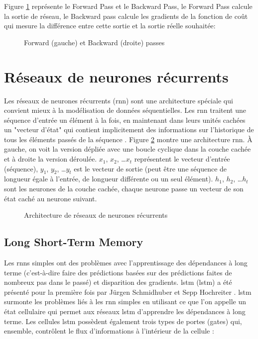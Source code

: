 Figure \ref{fig:forward-backward-pass} représente le Forward Pass et le Backward Pass, le Forward Pass calcule la sortie de réseau, le Backward pass calcule les gradients de la fonction de coût qui mesure la différence entre cette sortie et la sortie réelle souhaitée:

\begin{figure}[h]
    \centering
	
    \caption{Forward (gauche) et Backward (droite) passes}
    \label{fig:forward-backward-pass}
\end{figure}


\section{Réseaux de neurones récurrents}
Les réseaux de neurones récurrents (\acrshort{rnn}) sont une architecture spéciale qui convient mieux à la modélisation de données séquentielles. Les \acrshort{rnn} traitent une séquence d'entrée un élément à la fois, en maintenant dans leurs unités cachées un "vecteur d'état" qui contient implicitement des informations sur l'historique de tous les éléments passés de la séquence \cite{LeCun2015}. Figure \ref{fig:rnn} montre une architecture \acrshort{rnn}. À gauche, on voit la version dépliée avec une boucle cyclique dans la couche cachée et à droite la version déroulée. $x_1$, $x_2$, …$x_t$ représentent le vecteur d'entrée (séquence), $y_1$, $y_2$, …$y_t$ est le vecteur de sortie (peut être une séquence de longueur égale à l'entrée, de longueur différente ou un seul élément). $h_1$, $h_2$, …$h_t$ sont les neurones de la couche cachée, chaque neurone passe un vecteur de son état caché au neurone suivant.

\begin{figure}[H]
    \centering
    
    \caption{Architecture de réseaux de neurones récurrents}
    \label{fig:rnn}
\end{figure}

\subsection{Long Short-Term Memory}
\label{section:lstm}
Les \acrshort{rnn}s simples ont des problèmes avec l'apprentissage des dépendances à long terme (c'est-à-dire faire des prédictions basées sur des prédictions faites de nombreux pas dans le passé) et disparition des gradients. \acrlong{lstm} (\acrshort{lstm}) a été présenté pour la première fois par Jürgen Schmidhuber et Sepp Hochreiter \cite{Hochreiter1997}. \acrshort{lstm} surmonte les problèmes liés à les \acrshort{rnn} simples en utilisant ce que l'on appelle un état cellulaire qui permet aux réseaux \acrshort{lstm} d'apprendre les dépendances à long terme. Les cellules \acrshort{lstm} possèdent également trois types de portes (gates) qui, ensemble, contrôlent le flux d'informations à l'intérieur de la cellule :

